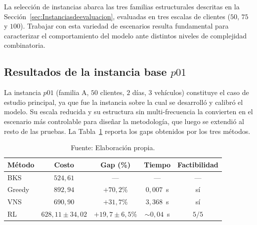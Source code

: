 La selección de instancias abarca las tres familias estructurales descritas en la Sección~\ref{sec:Instanciasdeevaluacion}, evaluadas en tres escalas de clientes ($50$, $75$ y $100$). Trabajar con esta variedad de escenarios resulta fundamental para caracterizar el comportamiento del modelo ante distintos niveles de complejidad combinatoria.

 

\subsection{Resultados de la instancia base $p01$} \label{sec:resultadosp01}
La instancia $p01$ (familia A, $50$ clientes, $2$ días, $3$ vehículos) constituye el caso de estudio principal, ya que fue la instancia sobre la cual se desarrolló y calibró el modelo. Su escala reducida y su estructura sin multi-frecuencia la convierten en el escenario más controlable para diseñar la metodología, que luego se extendió al resto de las pruebas. La Tabla~\ref{tab:resultados-p01} reporta los gaps obtenidos por los tres métodos.

\begin{table}[H]
    \centering
    \caption{\label{tab:resultados-p01} Resultados sobre la instancia $p01$. El RL se reporta como media $\pm$ desviación estándar sobre las 5 semillas factibles.}
    \caption*{Fuente: Elaboración propia.}
    \renewcommand{\arraystretch}{1.15}
    \setlength{\tabcolsep}{9pt}
    \begin{tabular}{@{}lcccc@{}}
        \toprule
        \textbf{Método} & \textbf{Costo} & \textbf{Gap (\%)} & \textbf{Tiempo} & \textbf{Factibilidad} \\
        \midrule
        BKS    & $524{,}61$  & ---          & ---       & --- \\
        Greedy & $892{,}94$  & $+70{,}2\%$  & $0{,}007$~s  & sí \\
        VNS    & $690{,}90$  & $+31{,}7\%$  & $3{,}368$~s  & sí \\
        RL     & $628{,}11 \pm 34{,}02$ & $+19{,}7 \pm 6{,}5\%$ & $\sim 0{,}04$~s & $5/5$ \\
        \bottomrule
    \end{tabular}
\end{table}


